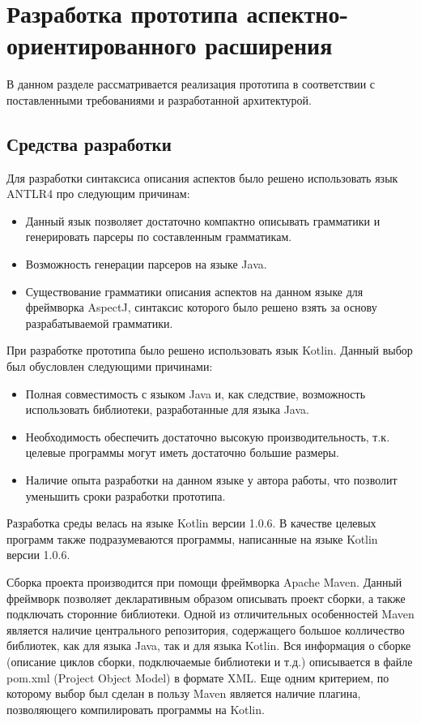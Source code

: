 \chapter{Разработка прототипа аспектно-ориентированного расширения}
\label{ch:develop}
В данном разделе рассматривается реализация прототипа в соответствии с
поставленными требованиями и разработанной архитектурой.
\section{Средства разработки}
\label{sec:dev_tools}
Для разработки синтаксиса описания аспектов было решено использовать язык ANTLR4
про следующим причинам:
\begin{itemize}
	\item Данный язык позволяет достаточно компактно описывать грамматики и
		  генерировать парсеры по составленным грамматикам.
	\item Возможность генерации парсеров на языке Java.
	\item Существование грамматики описания аспектов на данном языке для
		  фреймворка AspectJ, синтаксис которого было решено взять за основу
		  разрабатываемой грамматики.
\end{itemize}

При разработке прототипа было решено использовать язык Kotlin.
Данный выбор был обусловлен следующими причинами:
\begin{itemize}
	\item Полная совместимость с языком Java и, как следствие, возможность
		  использовать библиотеки, разработанные для языка Java.
	\item Необходимость обеспечить достаточно высокую производительность, т.к.
		  целевые программы могут иметь достаточно большие размеры.
	\item Наличие опыта разработки на данном языке у автора работы, что
		  позволит уменьшить сроки разработки прототипа.
\end{itemize}
Разработка среды велась на языке Kotlin версии 1.0.6.
В качестве целевых программ также подразумеваются программы, написанные на языке Kotlin версии 1.0.6.

Сборка проекта производится при помощи фреймворка Apache Maven.
Данный фреймворк позволяет декларативным образом описывать проект сборки, а
также подключать сторонние библиотеки.
Одной из отличительных особенностей Maven является наличие центрального
репозитория, содержащего большое колличество библиотек, как для языка Java, так
и для языка Kotlin.
Вся информация о сборке (описание циклов сборки, подключаемые библиотеки и т.д.)
описывается в файле pom.xml (Project Object Model) в формате XML.
Еще одним критерием, по которому выбор был сделан в пользу Maven является наличие плагина, позволяющего компилировать программы на Kotlin.
